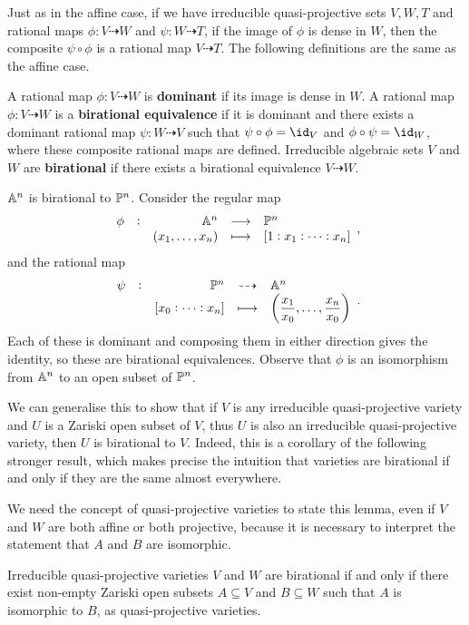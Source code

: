 Just as in the affine case, if we have irreducible quasi-projective sets $ V, W, T $ and rational maps $ \phi : V \dashrightarrow W $ and $ \psi : W \dashrightarrow T $, if the image of $ \phi $ is dense in $ W $, then the composite $ \psi \circ \phi $ is a rational map $ V \dashrightarrow T $. The following definitions are the same as the affine case.

\begin{definition*}
A rational map $ \phi : V \dashrightarrow W $ is \textbf{dominant} if its image is dense in $ W $. A rational map $ \phi : V \dashrightarrow W $ is a \textbf{birational equivalence} if it is dominant and there exists a dominant rational map $ \psi : W \dashrightarrow V $ such that $ \psi \circ \phi = \id_V $ and $ \phi \circ \psi = \id_W $, where these composite rational maps are defined. Irreducible algebraic sets $ V $ and $ W $ are \textbf{birational} if there exists a birational equivalence $ V \dashrightarrow W $.
\end{definition*}

\begin{note*}
$ \AA^n $ is birational to $ \PP^n $. Consider the regular map
$$ \function[\phi]{\AA^n}{\PP^n}{\br{x_1, \dots, x_n}}{\sbr{1 : x_1 : \dots : x_n}}, $$
and the rational map
$$ \rational[\psi]{\PP^n}{\AA^n}{\sbr{x_0 : \dots : x_n}}{\br{\dfrac{x_1}{x_0}, \dots, \dfrac{x_n}{x_0}}}. $$
Each of these is dominant and composing them in either direction gives the identity, so these are birational equivalences. Observe that $ \phi $ is an isomorphism from $ \AA^n $ to an open subset of $ \PP^n $.
\end{note*}

We can generalise this to show that if $ V $ is any irreducible quasi-projective variety and $ U $ is a Zariski open subset of $ V $, thus $ U $ is also an irreducible quasi-projective variety, then $ U $ is birational to $ V $. Indeed, this is a corollary of the following stronger result, which makes precise the intuition that varieties are birational if and only if they are the same almost everywhere.

\begin{note*}
We need the concept of quasi-projective varieties to state this lemma, even if $ V $ and $ W $ are both affine or both projective, because it is necessary to interpret the statement that $ A $ and $ B $ are isomorphic.
\end{note*}

\begin{lemma}
Irreducible quasi-projective varieties $ V $ and $ W $ are birational if and only if there exist non-empty Zariski open subsets $ A \subseteq V $ and $ B \subseteq W $ such that $ A $ is isomorphic to $ B $, as quasi-projective varieties.
\end{lemma}

